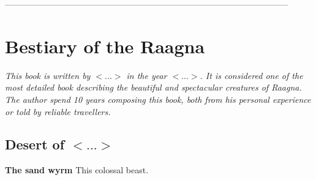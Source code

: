\documentclass[14p]{book}
\begin{document}
{\color{l} ---------------------------------------------------------------------------------------------------\\}

\chapter{Bestiary of the Raagna}

\emph{This book is written by $<...>$ in the year $<...>$. It is considered one of the most detailed book describing the beautiful and spectacular creatures of Raagna. The author spend 10 years composing this book, both from his personal experience or told by reliable travellers.}

\section {Desert of $<...>$}

\textbf{The sand wyrm} This colossal beast.

\end{document}
